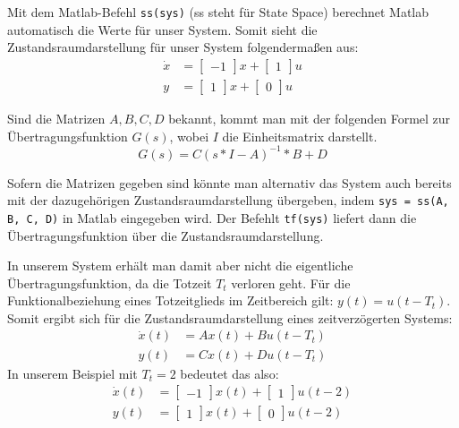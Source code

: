 Mit dem Matlab-Befehl \texttt{ss(sys)} (ss steht für State Space) berechnet Matlab automatisch die Werte für unser System. Somit sieht die Zustandsraumdarstellung für unser System folgendermaßen aus:
\begin{align*}
    \dot x & = \begin{bmatrix}
        -1
    \end{bmatrix}x + \begin{bmatrix}
        1
    \end{bmatrix}u \\
    y & = \begin{bmatrix}
        1
    \end{bmatrix}x + \begin{bmatrix}
        0
    \end{bmatrix}u
\end{align*}

Sind die Matrizen $A, B, C, D$ bekannt, kommt man mit der folgenden Formel zur Übertragungsfunktion $G(s)$, wobei $I$ die Einheitsmatrix darstellt.
\[
    G(s) = C(s * I - A)^{-1} * B + D
\]

Sofern die Matrizen gegeben sind könnte man alternativ das System auch bereits mit der dazugehörigen Zustandsraumdarstellung übergeben, indem \texttt{sys = ss(A, B, C, D)} in Matlab eingegeben wird. Der Befehlt \texttt{tf(sys)} liefert dann die Übertragungsfunktion über die Zustandsraumdarstellung.

In unserem System erhält man damit aber nicht die eigentliche Übertragungsfunktion, da die Totzeit $T_t$ verloren geht. Für die Funktionalbeziehung eines Totzeitglieds im Zeitbereich gilt: $y(t) = u(t-T_t)$. Somit ergibt sich für die Zustandsraumdarstellung eines zeitverzögerten Systems:
\begin{align*}
    \dot x(t) & = Ax(t) + Bu(t - T_t) \nonumber \\
    y(t) & = Cx(t) + Du(t - T_t)
\end{align*}
In unserem Beispiel mit $T_t = 2$ bedeutet das also:
\begin{align*}
    \dot x(t) & = \begin{bmatrix}
        -1
    \end{bmatrix}x(t) + \begin{bmatrix}
        1
    \end{bmatrix}u(t - 2) \nonumber \\
    y(t) & = \begin{bmatrix}
        1
    \end{bmatrix}x(t) + \begin{bmatrix}
        0
    \end{bmatrix}u(t - 2)
\end{align*}

